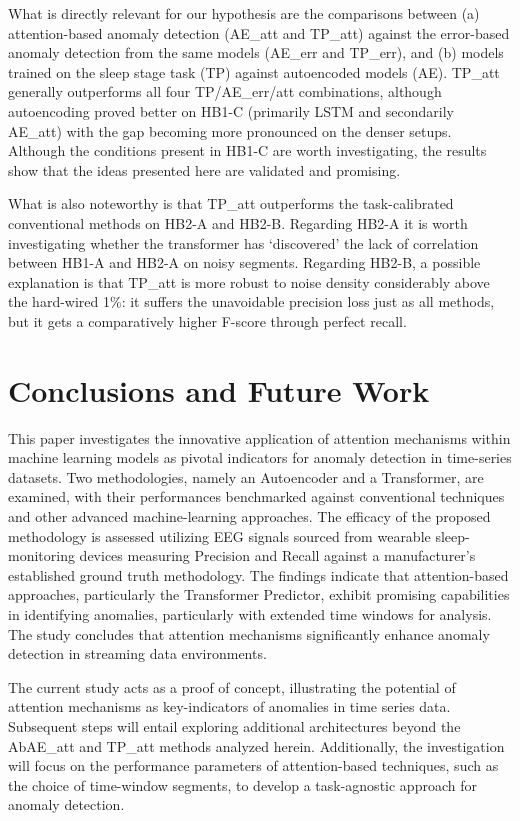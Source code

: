 \documentclass[conference]{IEEEtran}
\begin{document}
What is directly relevant for our hypothesis are the comparisons
between
(a) attention-based anomaly detection (AE\_att and TP\_att) against
the error-based anomaly detection from the same models (AE\_err and
TP\_err), and (b) models trained on the sleep stage task (TP) against
autoencoded models (AE).
TP\_att generally outperforms all four TP/AE\_err/att combinations,
although autoencoding proved better on HB1-C (primarily LSTM and
secondarily AE\_att) with the gap becoming more pronounced on the
denser setups. 
Although the conditions present in HB1-C are worth investigating,
the results show that the ideas presented here are validated and
promising.

What is also noteworthy is that TP\_att outperforms the
task-calibrated conventional methods on HB2-A and HB2-B.
Regarding HB2-A it is worth investigating whether the transformer has
`discovered' the lack of correlation between HB1-A and HB2-A on noisy
segments.
Regarding HB2-B, a possible explanation is that TP\_att is more robust
to noise density considerably above the hard-wired 1\%: it suffers
the unavoidable precision loss just as all methods, but it gets a
comparatively higher F-score through perfect recall.



\section{Conclusions and Future Work}
\label{sec:conc}

This paper investigates the innovative application of attention
mechanisms within machine learning models as pivotal indicators for
anomaly detection in time-series datasets. Two methodologies, namely
an Autoencoder and a Transformer, are examined, with their
performances benchmarked against conventional techniques and other
advanced machine-learning approaches. The efficacy of the proposed
methodology is assessed utilizing EEG signals sourced from wearable
sleep-monitoring devices measuring Precision and Recall against a
manufacturer's established ground truth methodology. The findings
indicate that attention-based approaches, particularly the Transformer
Predictor, exhibit promising capabilities in identifying anomalies,
particularly with extended time windows for analysis. The study
concludes that attention mechanisms significantly enhance anomaly
detection in streaming data environments.

The current study acts as a proof of concept, illustrating the
potential of attention mechanisms as key-indicators of anomalies in
time series data. Subsequent steps will entail exploring additional
architectures beyond the AbAE\_att and TP\_att methods analyzed
herein. Additionally, the investigation will focus on the performance
parameters of attention-based techniques, such as the choice of
time-window segments, to develop a task-agnostic approach for anomaly
detection.
\end{document}
